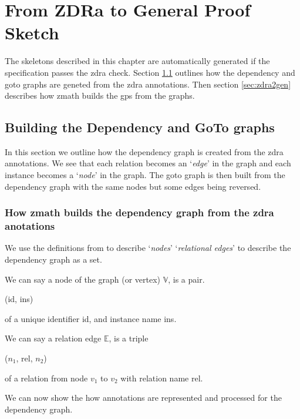 \chapter{From ZDRa to General Proof Sketch}
\label{ch:skeletons}

The skeletons described in this chapter are automatically generated if the specification passes the \gls{zdra} check. Section \ref{sec:buildinggraphs} outlines how the dependency and goto graphs are geneted from the \gls{zdra} annotations. Then section \ref{sec:zdra2gen} describes how \gls{zmath} builds the \gls{gps} from the graphs. 

\section{Building the Dependency and GoTo graphs}
\label{sec:buildinggraphs}

In this section we outline how the dependency graph is created from the \gls{zdra} annotations. We see that each relation becomes an `\emph{edge}' in the graph and each instance becomes a `\emph{node}' in the graph. The goto graph is then built from the dependency graph with the same nodes but some edges being reversed.

\subsection{How \gls{zmath} builds the dependency graph from the \gls{zdra} anotations}

We use the definitions from \cite{zengfirstyear} to describe `\emph{nodes}' `\emph{relational edges}' to describe the dependency graph as a set.

\begin{defin}[Nodes]
We can say a node of the graph (or vertex) $\mathbb{V}$, is a pair.
\begin{center}
(id, ins)
\end{center}
of a unique identifier id, and instance name ins. 
\end{defin} 

\begin{defin}
We can say a relation edge $\mathbb{E}$, is a triple
\begin{center}
($n_{1}$, rel, $n_{2}$)
\end{center}
of a relation from node $v_{1}$ to $v_{2}$ with relation name rel.
\end{defin} 

We can now show the how annotations are represented and processed for the dependency graph.

